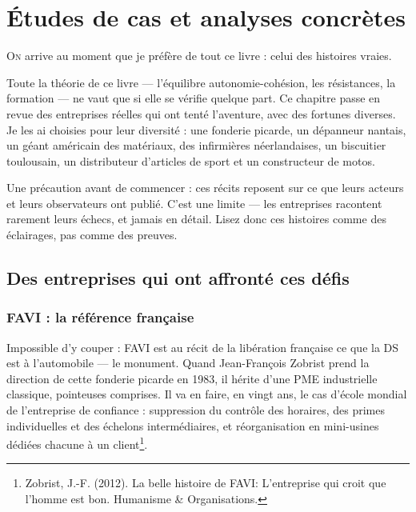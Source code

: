 
\chapter{Études de cas et analyses concrètes}

\lettrine[lines=2]{O}{n} arrive au moment que je préfère de tout ce livre : celui des histoires vraies.

Toute la théorie de ce livre — l'équilibre autonomie-cohésion, les résistances, la formation — ne vaut que si elle se vérifie quelque part. Ce chapitre passe en revue des entreprises réelles qui ont tenté l'aventure, avec des fortunes diverses. Je les ai choisies pour leur diversité : une fonderie picarde, un dépanneur nantais, un géant américain des matériaux, des infirmières néerlandaises, un biscuitier toulousain, un distributeur d'articles de sport et un constructeur de motos.

Une précaution avant de commencer : ces récits reposent sur ce que leurs acteurs et leurs observateurs ont publié. C'est une limite — les entreprises racontent rarement leurs échecs, et jamais en détail. Lisez donc ces histoires comme des éclairages, pas comme des preuves.

\section{Des entreprises qui ont affronté ces défis}

\subsection{FAVI : la référence française}

Impossible d'y couper : FAVI est au récit de la libération française ce que la DS est à l'automobile — le monument. Quand Jean-François Zobrist prend la direction de cette fonderie picarde en 1983, il hérite d'une PME industrielle classique, pointeuses comprises. Il va en faire, en vingt ans, le cas d'école mondial de l'entreprise de confiance : suppression du contrôle des horaires, des primes individuelles et des échelons intermédiaires, et réorganisation en mini-usines dédiées chacune à un client\footnote{Zobrist, J.-F. (2012). La belle histoire de FAVI: L'entreprise qui croit que l'homme est bon. Humanisme \& Organisations.}.

